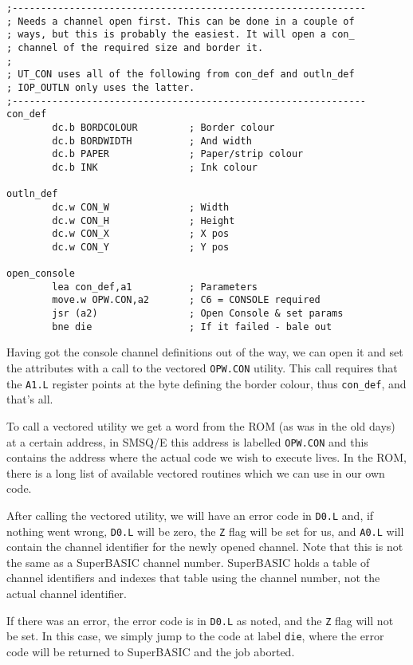 \begin{lstlisting}[caption={Tinyfpga - Open a Console},label={lis:Tinyfpga-Open-a-Console}]
;--------------------------------------------------------------
; Needs a channel open first. This can be done in a couple of
; ways, but this is probably the easiest. It will open a con_
; channel of the required size and border it.
;
; UT_CON uses all of the following from con_def and outln_def
; IOP_OUTLN only uses the latter.
;--------------------------------------------------------------
con_def
        dc.b BORDCOLOUR         ; Border colour
        dc.b BORDWIDTH          ; And width
        dc.b PAPER              ; Paper/strip colour
        dc.b INK                ; Ink colour

outln_def
        dc.w CON_W              ; Width
        dc.w CON_H              ; Height
        dc.w CON_X              ; X pos
        dc.w CON_Y              ; Y pos

open_console
        lea con_def,a1          ; Parameters
        move.w OPW.CON,a2       ; C6 = CONSOLE required
        jsr (a2)                ; Open Console & set params
        bne die                 ; If it failed - bale out

\end{lstlisting}

Having got the console channel definitions out of the way, we can
open it and set the attributes with a call to the vectored \texttt{OPW.CON}
utility. This call requires that the \texttt{A1.L} register points
at the byte defining the border colour, thus \texttt{con\_def}, and
that's all. 

To call a vectored utility we get a word from the ROM (as was in the
old days) at a certain address, in SMSQ/E this address is labelled
\texttt{OPW.CON} and this contains the address where the actual code
we wish to execute lives. In the ROM, there is a long list of available
vectored routines which we can use in our own code. 

After calling the vectored utility, we will have an error code in
\texttt{D0.L} and, if nothing went wrong, \texttt{D0.L} will be zero,
the \texttt{Z} flag will be set for us, and \texttt{A0.L} will contain
the channel identifier for the newly opened channel. Note that this
is not the same as a SuperBASIC channel number. SuperBASIC holds a
table of channel identifiers and indexes that table using the channel
number, not the actual channel identifier.

If there was an error, the error code is in \texttt{D0.L} as noted,
and the \texttt{Z} flag will not be set. In this case, we simply jump
to the code at label \texttt{die}, where the error code will be returned
to SuperBASIC and the job aborted.

